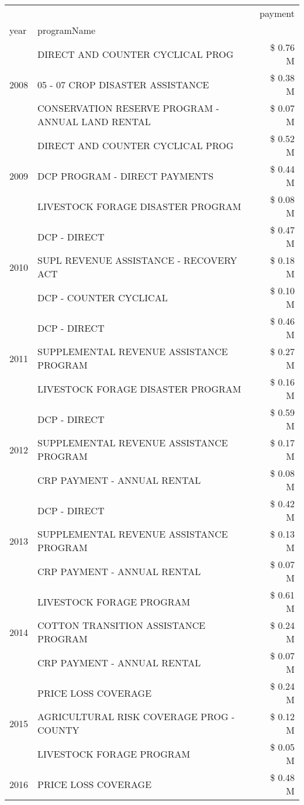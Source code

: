 \begin{tabular}{llr}
\toprule
 &  & payment \\
year & programName &  \\
\midrule
\multirow[t]{3}{*}{2008} & DIRECT AND COUNTER CYCLICAL PROG & \$ 0.76 M \\
 & 05 - 07 CROP DISASTER ASSISTANCE & \$ 0.38 M \\
 & CONSERVATION RESERVE PROGRAM - ANNUAL LAND RENTAL & \$ 0.07 M \\
\cline{1-3}
\multirow[t]{3}{*}{2009} & DIRECT AND COUNTER CYCLICAL PROG & \$ 0.52 M \\
 & DCP PROGRAM - DIRECT PAYMENTS & \$ 0.44 M \\
 & LIVESTOCK FORAGE DISASTER  PROGRAM & \$ 0.08 M \\
\cline{1-3}
\multirow[t]{3}{*}{2010} & DCP - DIRECT & \$ 0.47 M \\
 & SUPL REVENUE ASSISTANCE - RECOVERY ACT & \$ 0.18 M \\
 & DCP - COUNTER CYCLICAL & \$ 0.10 M \\
\cline{1-3}
\multirow[t]{3}{*}{2011} & DCP - DIRECT & \$ 0.46 M \\
 & SUPPLEMENTAL REVENUE ASSISTANCE PROGRAM & \$ 0.27 M \\
 & LIVESTOCK FORAGE DISASTER PROGRAM & \$ 0.16 M \\
\cline{1-3}
\multirow[t]{3}{*}{2012} & DCP - DIRECT & \$ 0.59 M \\
 & SUPPLEMENTAL REVENUE ASSISTANCE PROGRAM & \$ 0.17 M \\
 & CRP PAYMENT - ANNUAL RENTAL & \$ 0.08 M \\
\cline{1-3}
\multirow[t]{3}{*}{2013} & DCP - DIRECT & \$ 0.42 M \\
 & SUPPLEMENTAL REVENUE ASSISTANCE PROGRAM & \$ 0.13 M \\
 & CRP PAYMENT - ANNUAL RENTAL & \$ 0.07 M \\
\cline{1-3}
\multirow[t]{3}{*}{2014} & LIVESTOCK FORAGE PROGRAM & \$ 0.61 M \\
 & COTTON TRANSITION ASSISTANCE PROGRAM & \$ 0.24 M \\
 & CRP PAYMENT - ANNUAL RENTAL & \$ 0.07 M \\
\cline{1-3}
\multirow[t]{3}{*}{2015} & PRICE LOSS COVERAGE & \$ 0.24 M \\
 & AGRICULTURAL RISK COVERAGE PROG - COUNTY & \$ 0.12 M \\
 & LIVESTOCK FORAGE PROGRAM & \$ 0.05 M \\
\cline{1-3}
\multirow[t]{3}{*}{2016} & PRICE LOSS COVERAGE & \$ 0.48 M \\

\end{tabular}
